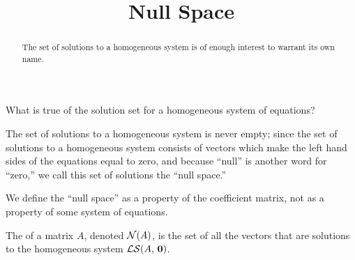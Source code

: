 \documentclass{ximera}
\title{Null Space}
\begin{document}
\begin{abstract}
  The set of solutions to a homogeneous system is of enough interest to warrant its own name.  
\end{abstract}
\maketitle

\begin{question}
  What is true of the solution set for a homogeneous system of
  equations?

  \begin{multipleChoice}
  \end{multipleChoice}

  \begin{feedback}[correct]
    The set of solutions to a homogeneous system is never empty; since
    the set of solutions to a homogeneous system consists of vectors
    which make the left hand sides of the equations equal to zero, and
    because ``null'' is another word for ``zero,'' we call this set of
    solutions the ``null space.''
  \end{feedback}
\end{question}

We define the ``null space'' as a property of the coefficient matrix,
not as a property of some system of equations.

\begin{definition}
  The  of a matrix $A$, denoted $\mathcal{N}\!\left(A\right)$, is the set
  of all the vectors that are solutions to the homogeneous system
  $\mathcal{LS}\!\left(A,\,\mathbf{0}\right)$.
\end{definition}
\end{document}
